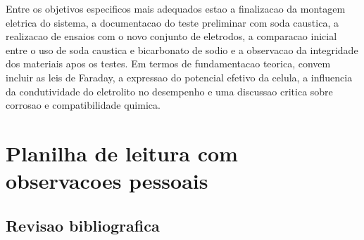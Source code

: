 \documentclass[12pt,oneside,a4paper,english,brazilian]{abntex2}
\begin{document}
Entre os objetivos especificos mais adequados estao a finalizacao da montagem eletrica do sistema, a documentacao do teste preliminar com soda caustica, a realizacao de ensaios com o novo conjunto de eletrodos, a comparacao inicial entre o uso de soda caustica e bicarbonato de sodio e a observacao da integridade dos materiais apos os testes. Em termos de fundamentacao teorica, convem incluir as leis de Faraday, a expressao do potencial efetivo da celula, a influencia da condutividade do eletrolito no desempenho e uma discussao critica sobre corrosao e compatibilidade quimica.

\section{Planilha de leitura com observacoes pessoais}

\subsection{Revisao bibliografica}

\setlength{\LTpre}{0pt}
\setlength{\LTpost}{0pt}
\renewcommand{\arraystretch}{1.2}
\end{document}
